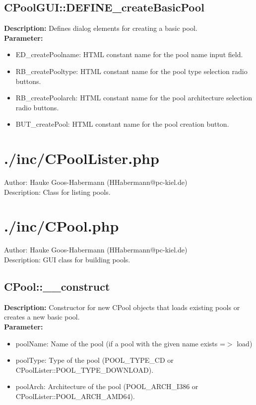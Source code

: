 \subsection{CPoolGUI::DEFINE\_createBasicPool}
\textbf{Description:} Defines dialog elements for creating a basic pool.\\
\textbf{Parameter:}
\begin{itemize}
\item ED\_createPoolname: HTML constant name for the pool name input field.
\item RB\_createPooltype: HTML constant name for the pool type selection radio buttons.
\item RB\_createPoolarch: HTML constant name for the pool architecture selection radio buttons.
\item BUT\_createPool: HTML constant name for the pool creation button.
\end{itemize}

\newpage\section{./inc/CPoolLister.php}
 Author: Hauke Goos-Habermann (HHabermann@pc-kiel.de)\\
 Description: Class for listing pools.\\

\newpage\section{./inc/CPool.php}
 Author: Hauke Goos-Habermann (HHabermann@pc-kiel.de)\\
 Description: GUI class for building pools.\\

\subsection{CPool::\_\_construct}
\textbf{Description:} Constructor for new CPool objects that loads existing pools or creates a new basic pool.\\
\textbf{Parameter:}
\begin{itemize}
\item poolName: Name of the pool (if a pool with the given name exists =$>$ load)
\item poolType: Type of the pool (POOL\_TYPE\_CD or CPoolLister::POOL\_TYPE\_DOWNLOAD).
\item poolArch: Architecture of the pool (POOL\_ARCH\_I386 or CPoolLister::POOL\_ARCH\_AMD64).
\end{itemize}

